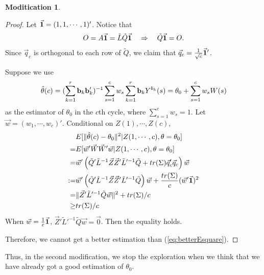 \documentclass{article}
\theoremstyle{plain}
\theoremstyle{definition}
\newtheorem{modification}{Moditication}
\begin{document}
\begin{modification}
\begin{proof}
Let $\vec{\bold{1}}=(1,1,\cdots,1)'$. Notice that
\begin{align*}
{O}=A\vec{\bold{1}}=\tilde{L}\tilde{Q}\vec{\bold{1}}\quad \Rightarrow\quad \tilde{Q}\vec{\bold{1}}=O.
\end{align*}
Since $\vec{q}_c$ is orthogonal to each row of $\tilde{Q}$, 
we claim that $\vec{q}_c=\frac{1}{\sqrt{c}}\vec{\bold{1}}'$. 

Suppose we use 
\[
\hat{\theta}(c)=(\sum_{k=1}^{r}\bold{b}_k\bold{b}_k')^{-1}\sum_{s=1}^{c}w_s\sum_{k=1}^{r}\bold{b}_kY^{b_k}(s)=\theta_0+\sum_{s=1}^{c}w_s W(s)
\]
as the estimator of $\theta_0$ in the $c$th cycle, where $\sum_{s=1}^{c}w_s=1$. Let $\vec{w}=(w_1,\cdots,w_c)'$. Conditional on $Z(1),\cdots,Z(c)$, 
\begin{align*}
&E[\|\hat{\theta}(c)-\theta_0\|^2|Z(1,\cdots,c),\theta=\theta_0]\\
=&E[\vec{w}'\vec{W}\vec{W}'\vec{w}|Z(1,\cdots,c),\theta=\theta_0]\\
=& \vec{w}'\left(\tilde{Q}'\tilde{L}^{-1}\vec{Z}\vec{Z}'\tilde{L}'^{-1}\tilde{Q} + tr(\Sigma)\vec{q}_c'\vec{q}_c\right)\vec{w}\\
:=&\vec{w}'\left(\tilde{Q}'\tilde{L}^{-1}\vec{Z}\vec{Z}'\tilde{L}'^{-1}\tilde{Q}\right)\vec{w}+\frac{tr(\Sigma)}{c}(\vec{w}'\vec{\bold{1}})^2\\
=&\|\vec{Z}'\tilde{L}'^{-1}\tilde{Q}\vec{w}\|^2+tr(\Sigma)/c\\
\geq & tr(\Sigma)/c
\end{align*}
When $\vec{w}=\frac{1}{c}\vec{\bold{1}}$, $\vec{Z}'\tilde{L}'^{-1}\tilde{Q}\vec{w}=\vec{0}$. Then the equality holds.

Therefore, we cannot get a better estimation than (\ref{eq:betterEsquare}).

\end{proof}

Thus, in the second modification, we stop the exploration when we think that we have already got a good estimation of $\theta_{0}$.


\end{modification}
\end{document}
